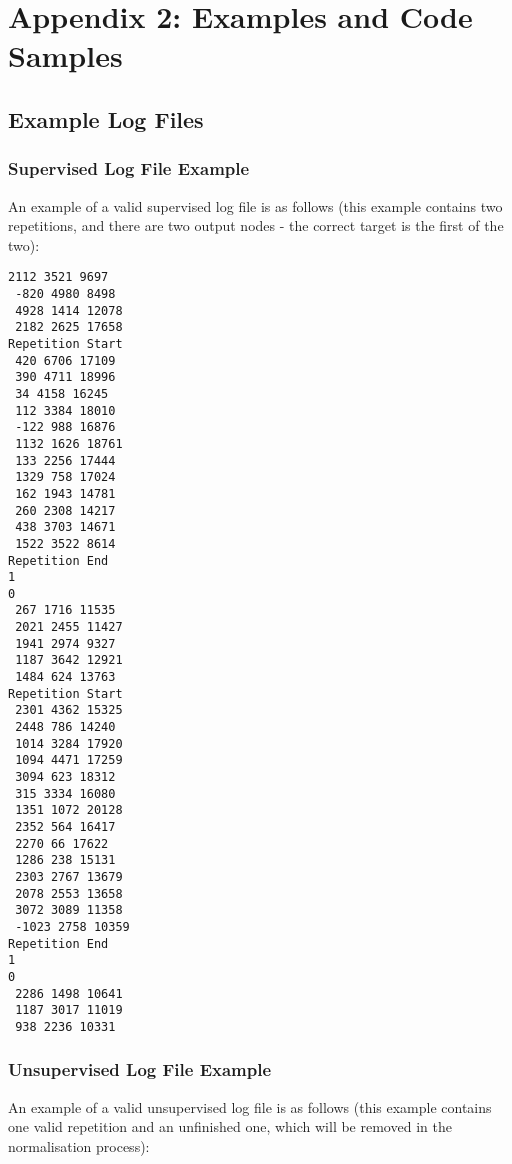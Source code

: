 \documentclass[a4paper]{article}
\begin{document}

\section{Appendix 2: Examples and Code Samples}

\subsection{Example Log Files}%

\subsubsection{Supervised Log File Example}

An example of a valid supervised log file is as follows (this example contains two repetitions, and there are two output nodes - the correct target is the first of the two):

\begin{lstlisting}
2112 3521 9697
 -820 4980 8498
 4928 1414 12078
 2182 2625 17658
Repetition Start
 420 6706 17109
 390 4711 18996
 34 4158 16245
 112 3384 18010
 -122 988 16876
 1132 1626 18761
 133 2256 17444
 1329 758 17024
 162 1943 14781
 260 2308 14217
 438 3703 14671
 1522 3522 8614
Repetition End
1
0
 267 1716 11535
 2021 2455 11427
 1941 2974 9327
 1187 3642 12921
 1484 624 13763
Repetition Start
 2301 4362 15325
 2448 786 14240
 1014 3284 17920
 1094 4471 17259
 3094 623 18312
 315 3334 16080
 1351 1072 20128
 2352 564 16417
 2270 66 17622
 1286 238 15131
 2303 2767 13679
 2078 2553 13658
 3072 3089 11358
 -1023 2758 10359
Repetition End
1
0
 2286 1498 10641
 1187 3017 11019
 938 2236 10331
\end{lstlisting}

\subsubsection{Unsupervised Log File Example}

An example of a valid unsupervised log file is as follows (this example contains one valid repetition and an unfinished one, which will be removed in the normalisation process):
\end{document}
